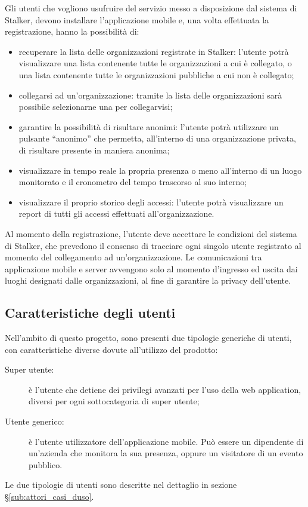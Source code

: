 \documentclass[../analisi-dei-requisiti.tex]{subfiles}
\begin{document}
Gli utenti che vogliono usufruire del servizio messo a disposizione dal sistema di Stalker, devono installare l'applicazione mobile e, una volta effettuata la registrazione, hanno la possibilità di:
\begin{itemize}
  \item recuperare la lista delle organizzazioni registrate in Stalker: l'utente potrà visualizzare una lista contenente tutte le organizzazioni a cui è collegato, o una lista contenente tutte le organizzazioni pubbliche a cui non è collegato;
  \item collegarsi ad un'organizzazione: tramite la lista delle organizzazioni sarà possibile selezionarne una per collegarvisi;
  \item garantire la possibilità di risultare anonimi: l'utente potrà utilizzare un pulsante ``anonimo'' che permetta, all'interno di una organizzazione privata, di risultare presente in maniera anonima;
  \item visualizzare in tempo reale la propria presenza o meno all'interno di un luogo monitorato e il cronometro del tempo trascorso al suo interno;
  \item visualizzare il proprio storico degli accessi: l'utente potrà visualizzare un report di tutti gli accessi effettuati all'organizzazione.

\end{itemize}
Al momento della registrazione, l'utente deve accettare le condizioni del sistema di Stalker, che prevedono il consenso di tracciare ogni singolo utente registrato al momento del collegamento ad un'organizzazione.
Le comunicazioni tra applicazione mobile e server avvengono solo al momento d'ingresso ed uscita dai luoghi designati dalle organizzazioni, al fine di garantire la privacy dell'utente.


\subsection{Caratteristiche degli utenti}%
\label{sub:caratteristiche_degli_utenti}
Nell'ambito di questo progetto, sono presenti due tipologie generiche di utenti, con caratteristiche diverse dovute all'utilizzo del prodotto:
\begin{description}
  \item[Super utente:] è l'utente che detiene dei privilegi avanzati per l'uso della web application, diversi per ogni sottocategoria di super utente;
  \item[Utente generico:] è l'utente utilizzatore dell'applicazione mobile. Può essere un dipendente di un'azienda che monitora la sua presenza, oppure un visitatore di un evento pubblico.
\end{description}
Le due tipologie di utenti sono descritte nel dettaglio in sezione §\ref{sub:attori_casi_duso}.
\end{document}
